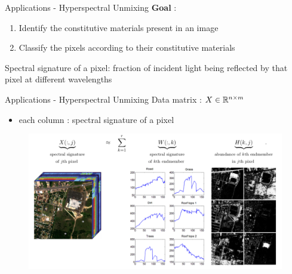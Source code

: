 \begin{frame}{Applications - Hyperspectral Unmixing}
    \textbf{Goal} :
    \begin{enumerate}
        \item Identify the constitutive materials present in an image
        \item Classify the pixels according to their constitutive materials
    \end{enumerate}
    \vspace{1cm}
    Spectral signature of a pixel: fraction of incident light being reflected by that pixel at different wavelengths\\
\end{frame}

\begin{frame}{Applications - Hyperspectral Unmixing}
    Data matrix : $X\in\mathbb{R}^{n\times m}$\\
    \begin{itemize}
        \item each column : spectral signature of a pixel
    \end{itemize}
    \begin{figure}
        \centering
        \includegraphics[width=0.85\linewidth]{../images/NMF_app3.png}
    \end{figure}
\end{frame}